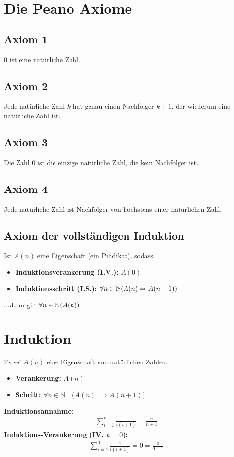 \section{Die Peano Axiome}
\subsection{Axiom 1}
0 ist eine natürliche Zahl.
\subsection{Axiom 2}
Jede natürliche Zahl $k$ hat genau einen Nachfolger $k+1$, der wiederum eine natürliche Zahl ist.
\subsection{Axiom 3}
Die Zahl 0 ist die einzige natürliche Zahl, die kein Nachfolger ist.
\subsection{Axiom 4}
Jede natürliche Zahl ist Nachfolger von höchstens einer natürlichen Zahl.
\subsection{Axiom der vollständigen Induktion}
Ist $A(n)$ eine Eigenschaft (ein Prädikat), sodass...
\begin{itemize}
    \item \textbf{Induktionsverankerung (I.V.):} $A(0)$
    \item \textbf{Induktionsschritt (I.S.):} $\forall{n} \in \mathbb{N} (A(n) \Rightarrow A(n+1))$
\end{itemize} 
...dann gilt $\forall{n} \in \mathbb{N} (A(n))$

\section{Induktion}
Es sei $A(n)$ eine Eigenschaft von natürlichen Zahlen:

\begin{itemize}
    \item \textbf{Verankerung:} $A(n)$
    \item \textbf{Schritt:} $\forall n \in \mathbb{N} \quad \big(A(n) \implies A(n+1)\big)$
\end{itemize}
\textbf{Induktionsannahme:}
\begin{align*}
    \sum_{i=1}^n \frac{1}{i(i+1)} = \frac{n}{n+1}
\end{align*}
\textbf{Induktions-Verankerung (IV, $n=0$):}
\begin{align*}
    \sum_{i=1}^0 \frac{1}{i(i+1)} = 0 = \frac{0}{0+1}
\end{align*}

